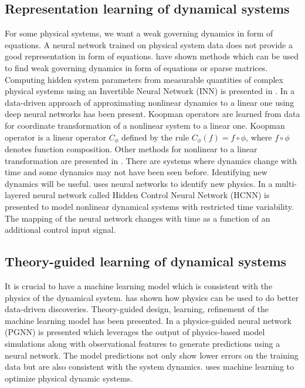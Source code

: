 \documentclass[conference]{IEEEtran}
\begin{document}
\subsection{\textbf{Representation learning of dynamical systems}}

For some physical systems, we want a weak governing dynamics in form of equations. A neural network trained on physical system data does not provide a good representation in form of equations. \cite{ardizzone2018analyzing, lusch2017deep} have shown methods which can be used to find weak governing dynamics in form of equations or sparse matrices. Computing hidden system parameters from measurable quantities of complex physical systems using an Invertible Neural Network (INN) is presented in \cite{ardizzone2018analyzing}. In \cite{lusch2017deep} a data-driven approach of approximating nonlinear dynamics to a linear one using deep neural networks has been present. Koopman operators \cite{Koopman315} are learned from data for coordinate transformation of a nonlinear system to a linear one. Koopman operator \cite{Koopman315} is a linear operator $C_{\phi}$ defined by the rule $C_{\phi}(f) = f \circ \phi$, where $f \circ \phi$ denotes function composition. Other methods for nonlinear to a linear transformation are presented in \cite{d'agnolo2018learning, levin1991nips}. There are systems where dynamics change with time and some dynamics may not have been seen before. Identifying new dynamics will be useful. \cite{d'agnolo2018learning} uses neural networks to identify new physics. In \cite{levin1991nips} a multi-layered neural network called Hidden Control Neural Network (HCNN) is presented to model nonlinear dynamical systems with restricted time variability. The mapping of the neural network changes with time as a function of an additional control input signal.

\subsection{\textbf{Theory-guided learning of dynamical systems}}

It is crucial to have a machine learning model which is consistent with the physics of the dynamical system. \cite{karpatne2017theory-guided} has shown how physics can be used to do better data-driven discoveries. Theory-guided design, learning, refinement of the machine learning model has been presented. In \cite{karpatne2017nips, karpatne2017physics-guided} a physics-guided neural network (PGNN) is presented which leverages the output of physics-based model simulations along with observational features to generate predictions using a neural network. The model predictions not only show lower errors on the training data but are also consistent with the system dynamics. \cite{hermans2014automated} uses machine learning to optimize physical dynamic systems.
\end{document}
